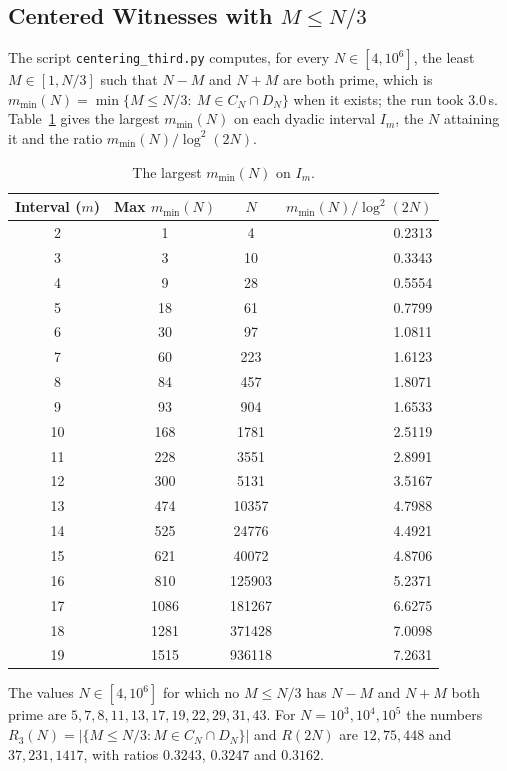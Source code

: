 \documentclass[11pt]{amsart}
\theoremstyle{definition}
\theoremstyle{remark}
\begin{document}
\subsection{Centered Witnesses with $M\leq N/3$}\label{subsec:third}
The script \texttt{centering\_third.py} computes, for every $N\in[4,10^6]$, the least $M\in[1,N/3]$ such that $N-M$ and $N+M$ are both prime, which is $m_{\min}(N)=\min\{M\leq N/3:\ M\in C_N\cap D_N\}$ when it exists; the run took $3.0$\,s. Table~\ref{tab:third} gives the largest $m_{\min}(N)$ on each dyadic interval $I_m$, the $N$ attaining it and the ratio $m_{\min}(N)/\log^2(2N)$.
\begin{table}[H]
\caption{The largest $m_{\min}(N)$ on $I_m$.}
\label{tab:third}
\small
\begin{tabularx}{\textwidth}{cccr}
\hline
\textbf{Interval ($m$)} & \textbf{Max $m_{\min}(N)$} & \textbf{$N$} & \textbf{$m_{\min}(N)/\log^2(2N)$} \\
\hline
2 & 1 & 4 & 0.2313 \\
3 & 3 & 10 & 0.3343 \\
4 & 9 & 28 & 0.5554 \\
5 & 18 & 61 & 0.7799 \\
6 & 30 & 97 & 1.0811 \\
7 & 60 & 223 & 1.6123 \\
8 & 84 & 457 & 1.8071 \\
9 & 93 & 904 & 1.6533 \\
10 & 168 & 1781 & 2.5119 \\
11 & 228 & 3551 & 2.8991 \\
12 & 300 & 5131 & 3.5167 \\
13 & 474 & 10357 & 4.7988 \\
14 & 525 & 24776 & 4.4921 \\
15 & 621 & 40072 & 4.8706 \\
16 & 810 & 125903 & 5.2371 \\
17 & 1086 & 181267 & 6.6275 \\
18 & 1281 & 371428 & 7.0098 \\
19 & 1515 & 936118 & 7.2631 \\
\hline
\end{tabularx}
\end{table}
The values $N\in[4,10^6]$ for which no $M\leq N/3$ has $N-M$ and $N+M$ both prime are $5,7,8,11,13,17,19,22,29,31,43$. For $N=10^3,10^4,10^5$ the numbers $R_3(N)=|\{M\leq N/3: M\in C_N\cap D_N\}|$ and $R(2N)$ are $12,75,448$ and $37,231,1417$, with ratios $0.3243$, $0.3247$ and $0.3162$.
\end{document}
